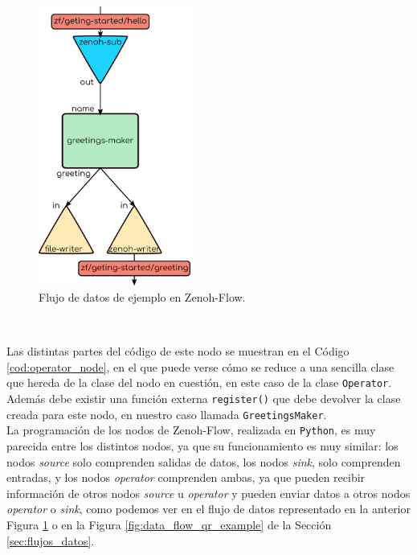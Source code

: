 \begin{figure} [h!]
  \begin{center}
    \includegraphics[width=5cm]{figs/zenoh_flow_example}
  \end{center}
  \caption{Flujo de datos de ejemplo en Zenoh-Flow.}
  \label{fig:zf_example}
\end{figure}\

Las distintas partes del código de este nodo se muestran en el Código
\ref{cod:operator_node}, en el que puede verse cómo se reduce a una sencilla
clase que hereda de la clase del nodo en cuestión, en este caso de la clase
\verb|Operator|. Además debe existir una función externa \verb|register()| que
debe devolver la clase creada para este nodo, en nuestro caso llamada
\verb|GreetingsMaker|.
\\

La programación de los nodos de Zenoh-Flow, realizada en \texttt{Python}, es muy
parecida entre los distintos nodos, ya que su funcionamiento es muy similar: los
nodos \textit{source} solo comprenden salidas de datos, los nodos \textit{sink},
solo comprenden entradas, y los nodos \textit{operator} comprenden ambas, ya que
pueden recibir información de otros nodos \textit{source} u \textit{operator} y
pueden enviar datos a otros nodos \textit{operator} o \textit{sink}, como
podemos ver en el flujo de datos representado en la anterior Figura
\ref{fig:zf_example} o en la Figura \ref{fig:data_flow_qr_example} de la Sección
\ref{sec:flujos_datos}.
\\

